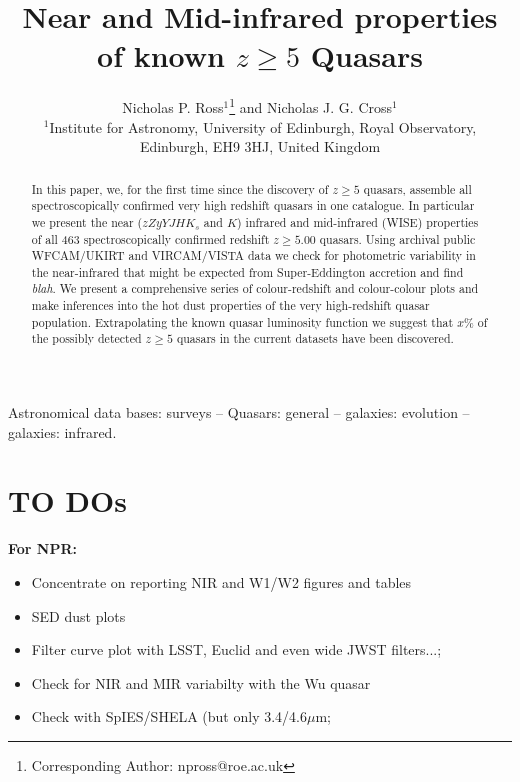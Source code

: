 \documentclass[usenatbib]{mnras}
\begin{document}
\title[Very high-$z$ Quasars]
        {Near and Mid-infrared properties of known $z\geq5$ Quasars}
\author[Ross \& Cross]
       {Nicholas P. Ross$^{1}$\thanks{Corresponding Author: npross@roe.ac.uk} and Nicholas J. G. Cross$^{1}$
\\ 
$^1$Institute for Astronomy, University of Edinburgh, Royal Observatory, Edinburgh, EH9 3HJ, United Kingdom\\
}

\maketitle
\begin{abstract}
In this paper, we, for the first time since the discovery of $z\geq5$
quasars, assemble all spectroscopically confirmed very high redshift
quasars in one catalogue.  In particular we present the near
($zZyYJHK_{s}$ and $K$) infrared and mid-infrared (WISE) properties of
all 463 spectroscopically confirmed redshift $z\geq5.00$ quasars.
Using archival public WFCAM/UKIRT and VIRCAM/VISTA data we check for
photometric variability in the near-infrared that might be expected
from Super-Eddington accretion and find {\it blah}.  We present a
comprehensive series of colour-redshift and colour-colour plots and
make inferences into the hot dust properties of the very high-redshift
quasar population. Extrapolating the known quasar luminosity function
we suggest that $x$\% of the possibly detected $z\geq5$ quasars in the
current datasets have been discovered.
\end{abstract}


\begin{keywords}
Astronomical data bases: surveys -- 
Quasars: general -- 
galaxies: evolution -- 
galaxies: infrared.
\end{keywords}

\iffalse
\section*{TO DOs}
{\bf For NPR: }
\begin{itemize}
\item Concentrate on reporting NIR and W1/W2 figures and tables
\item SED dust plots 
\item Filter curve plot with LSST, Euclid and even wide JWST filters...; 
\item Check for NIR and MIR variabilty with the Wu quasar
\item Check with SpIES/SHELA (but only 3.4/4.6$\mu$m; 
\end{itemize}
\end{document}

